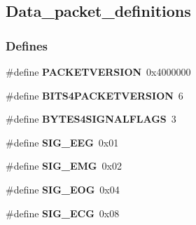 \hypertarget{group__data__packet__definitions}{
\subsection{Data\_\-packet\_\-definitions}
\label{group__data__packet__definitions}
}
\subsubsection*{Defines}
\begin{DoxyCompactItemize}
\item 
\hypertarget{group__data__packet__definitions_gaf432ecb598c63b0bb2de1653eaf344b1}{
\#define {\bfseries PACKETVERSION}~0x4000000}
\label{group__data__packet__definitions_gaf432ecb598c63b0bb2de1653eaf344b1}

\item 
\hypertarget{group__data__packet__definitions_ga41992fd171f1b045f221d1fdee380a1b}{
\#define {\bfseries BITS4PACKETVERSION}~6}
\label{group__data__packet__definitions_ga41992fd171f1b045f221d1fdee380a1b}

\item 
\hypertarget{group__data__packet__definitions_gacdb7f2c769a17bde785b473f34a76863}{
\#define {\bfseries BYTES4SIGNALFLAGS}~3}
\label{group__data__packet__definitions_gacdb7f2c769a17bde785b473f34a76863}

\item 
\hypertarget{group__data__packet__definitions_ga4e064e6d7163bd554bf8d3fa0de9f04a}{
\#define {\bfseries SIG\_\-EEG}~0x01}
\label{group__data__packet__definitions_ga4e064e6d7163bd554bf8d3fa0de9f04a}

\item 
\hypertarget{group__data__packet__definitions_gaa6126472f49f22edcdc5bcb6ccf64382}{
\#define {\bfseries SIG\_\-EMG}~0x02}
\label{group__data__packet__definitions_gaa6126472f49f22edcdc5bcb6ccf64382}

\item 
\hypertarget{group__data__packet__definitions_gad16552bcdac5ca7643157b47a6c8a3f3}{
\#define {\bfseries SIG\_\-EOG}~0x04}
\label{group__data__packet__definitions_gad16552bcdac5ca7643157b47a6c8a3f3}

\item 
\hypertarget{group__data__packet__definitions_ga6e3a487c13970da3b8e4e697ec218820}{
\#define {\bfseries SIG\_\-ECG}~0x08}
\label{group__data__packet__definitions_ga6e3a487c13970da3b8e4e697ec218820}


\end{DoxyCompactItemize}
